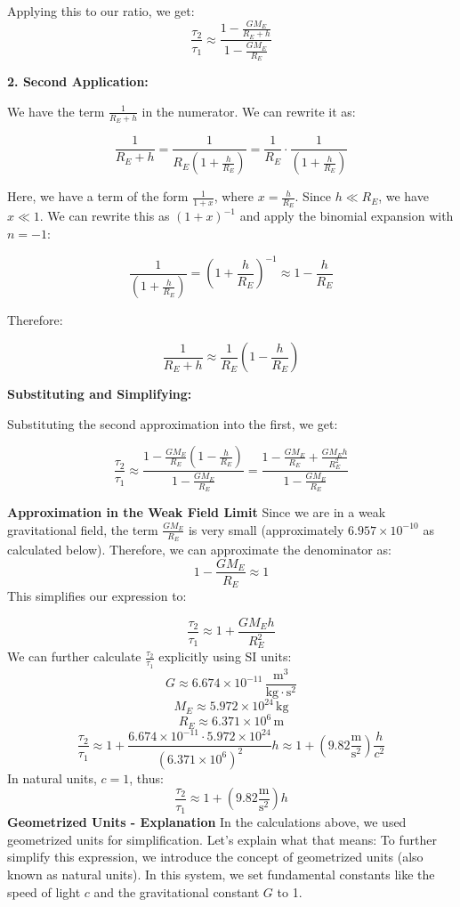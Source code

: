     Applying this to our ratio, we get:
    \[
        \frac{\tau_2}{\tau_1} \approx \frac{1 - \frac{GM_E}{R_E + h}}{1 - \frac{GM_E}{R_E}}
    \]

    \textbf{2. Second Application:}

    We have the term \(\frac{1}{R_E + h}\) in the numerator. We can rewrite it as:

    \[
        \frac{1}{R_E + h} = \frac{1}{R_E(1 + \frac{h}{R_E})} = \frac{1}{R_E} \cdot \frac{1}{(1 + \frac{h}{R_E})}
    \]

    Here, we have a term of the form \(\frac{1}{1 + x}\), where \(x = \frac{h}{R_E}\). Since \(h \ll R_E\), we have \(x \ll 1\). We can rewrite this as \((1 + x)^{-1}\) and apply the binomial expansion with \(n = -1\):

    \[
        \frac{1}{(1 + \frac{h}{R_E})} = (1 + \frac{h}{R_E})^{-1} \approx 1 - \frac{h}{R_E}
    \]

    Therefore:

    \[
        \frac{1}{R_E + h} \approx \frac{1}{R_E}\left(1 - \frac{h}{R_E}\right)
    \]

    \textbf{Substituting and Simplifying:}

    Substituting the second approximation into the first, we get:

    \[
        \frac{\tau_2}{\tau_1} \approx \frac{1 - \frac{GM_E}{R_E}\left(1 - \frac{h}{R_E}\right)}{1 - \frac{GM_E}{R_E}} = \frac{1 - \frac{GM_E}{R_E} + \frac{GM_Eh}{R_E^2}}{1 - \frac{GM_E}{R_E}}
    \]

    \textbf{Approximation in the Weak Field Limit}
    Since we are in a weak gravitational field, the term \(\frac{GM_E}{R_E}\) is very small (approximately \(6.957 \times 10^{-10}\) as calculated below). Therefore, we can approximate the denominator as:
    \[
        1-\frac{GM_E}{R_E} \approx 1
    \]
    This simplifies our expression to:

    \[
        \frac{\tau_2}{\tau_1} \approx 1 + \frac{GM_E h}{R_E^2}
    \]
    We can further calculate \(\frac{\tau_2}{\tau_1}\) explicitly using SI units:
    \[
        G \approx 6.674 \times 10^{-11} \, \frac{\mathrm{m^3}}{\mathrm{kg \cdot s^2}}
    \]
    \[
        M_E \approx 5.972 \times 10^{24} \, \mathrm{kg}
    \]
    \[
        R_E \approx 6.371 \times 10^6 \, \mathrm{m}
    \]
    \[
        \frac{\tau_2}{\tau_1} \approx 1 + \frac{6.674 \times 10^{-11} \cdot 5.972 \times 10^{24}}{(6.371 \times 10^6)^2} h \approx 1 + (9.82 \frac{\mathrm{m}}{\mathrm{s^2}}) \frac{h}{c^2}
    \]
    In natural units, \(c=1\), thus:
    \[
        \frac{\tau_2}{\tau_1} \approx 1 + (9.82 \frac{\mathrm{m}}{\mathrm{s^2}})h
    \]
    \textbf{Geometrized Units - Explanation}
    In the calculations above, we used geometrized units for simplification. Let's explain what that means:
    To further simplify this expression, we introduce the concept of geometrized units (also known as natural units). In this system, we set fundamental constants like the speed of light \(c\) and the gravitational constant \(G\) to 1.

